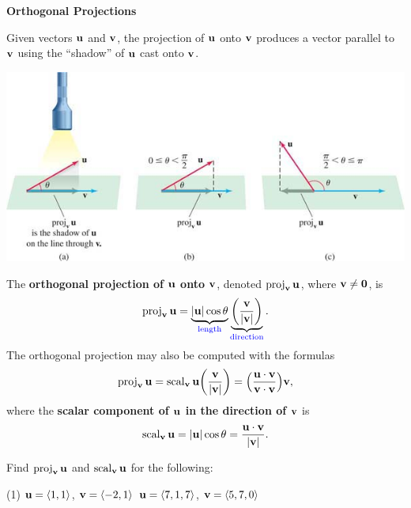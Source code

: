 \documentclass[mathNotesPreamble]{subfiles}
\begin{document}
  \textbf{Orthogonal Projections}

  \noindent
  Given vectors ${\mathbf{u}}$ and ${\mathbf{v}}$, the projection of ${\mathbf{u}}$ onto ${\mathbf{v}}$ produces a vector parallel to ${\mathbf{v}}$ using the ``shadow'' of ${\mathbf{u}}$ cast onto ${\mathbf{v}}$.
  \begin{center}
    \includegraphics[width=0.9\linewidth]{images/briggs_13_03/fig13_47}
  \end{center}
  \pagebreak

  \begin{defn*}
    The \textbf{orthogonal projection of ${\mathbf{u}}$ onto ${\mathbf{v}}$}, denoted $\operatorname{proj}_{\mathbf{v}} {\mathbf{u}}$, where ${\mathbf{v}}\neq\mathbf{0}$, is
      \[\operatorname{proj}_{\mathbf{v}} {\mathbf{u}} =\underbrace{{\left\vert{\mathbf{u}}\right\vert}\cos\theta}_{\textnormal{\textcolor{blue}{length}}}\underbrace{{\left(\frac{{\mathbf{v}}}{{\left\vert{\mathbf{v}}\right\vert}}\right)}}_{\textnormal{\textcolor{blue}{direction}}}.\]
    The orthogonal projection may also be computed with the formulas
      \[\operatorname{proj}_{\mathbf{v}} {\mathbf{u}}=\operatorname{scal}_{\mathbf{v}} {\mathbf{u}}{\left(\frac{{\mathbf{v}}}{{\left\vert{\mathbf{v}}\right\vert}}\right)}={\left(\frac{{\mathbf{u}}\cdot{\mathbf{v}}}{{\mathbf{v}}\cdot{\mathbf{v}}}\right)}{\mathbf{v}},\]
    where the \textbf{scalar component of ${\mathbf{u}}$ in the direction of ${\mathbf{v}}$} is
      \[\operatorname{scal}_{\mathbf{v}} {\mathbf{u}}={\left\vert{\mathbf{u}}\right\vert}\cos\theta=\frac{{\mathbf{u}}\cdot{\mathbf{v}}}{{\left\vert{\mathbf{v}}\right\vert}}.\]
  \end{defn*}

  \begin{ex*}
    Find $\operatorname{proj}_{\mathbf{v}}{\mathbf{u}}$ and $\operatorname{scal}_{\mathbf{v}}{\mathbf{u}}$ for the following:
    \begin{tasks}[after-item-skip=\stretch{1}, label=\textbullet](1)
      \task ${\mathbf{u}}={\left\langle 1,1 \right\rangle}$, ${\mathbf{v}}={\left\langle -2,1 \right\rangle}$
      \task ${\mathbf{u}}={\left\langle 7,1,7 \right\rangle}$, ${\mathbf{v}}={\left\langle 5,7,0 \right\rangle}$
    \end{tasks}
  \end{ex*}


  \pagebreak
\end{document}
